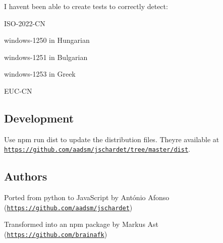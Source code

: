 I haven\textquotesingle{}t been able to create tests to correctly detect\+:


\begin{DoxyItemize}
\item I\+S\+O-\/2022-\/\+CN
\item windows-\/1250 in Hungarian
\item windows-\/1251 in Bulgarian
\item windows-\/1253 in Greek
\item E\+U\+C-\/\+CN
\end{DoxyItemize}

\subsection*{Development }

Use {\ttfamily npm run dist} to update the distribution files. They\textquotesingle{}re available at \href{https://github.com/aadsm/jschardet/tree/master/dist}{\tt https\+://github.\+com/aadsm/jschardet/tree/master/dist}.

\subsection*{Authors }

Ported from python to Java\+Script by António Afonso (\href{https://github.com/aadsm/jschardet}{\tt https\+://github.\+com/aadsm/jschardet})

Transformed into an npm package by Markus Ast (\href{https://github.com/brainafk}{\tt https\+://github.\+com/brainafk}) 